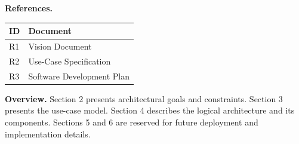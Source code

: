 \medskip
\noindent\textbf{References.}

\noindent
\begin{tabularx}{\textwidth}{|L{1.5cm}|Y|}
    \hline
    \textbf{ID} & \textbf{Document} \\ \hline
    R1 & Vision Document \\ \hline
    R2 & Use-Case Specification \\ \hline
    R3 & Software Development Plan \\ \hline
\end{tabularx}

\medskip
\noindent\textbf{Overview.}
Section 2 presents architectural goals and constraints.
Section 3 presents the use-case model.
Section 4 describes the logical architecture and its components.
Sections 5 and 6 are reserved for future deployment and
implementation details.
